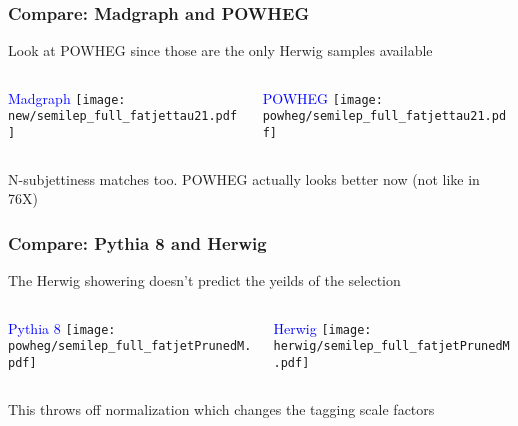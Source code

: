 \documentclass{beamer}
\begin{document}
\begin{frame}
  \frametitle{Compare: Madgraph and POWHEG}
  Look at POWHEG since those are the only Herwig samples available
  \vspace{6pt}
  \begin{columns}
    \begin{column}{0.5\linewidth}
      \centering
      \textcolor{blue}{Madgraph}
      \texttt{[image: new/semilep\_full\_fatjettau21.pdf]}
    \end{column}
    \begin{column}{0.5\linewidth}
      \centering
      \textcolor{blue}{POWHEG}
      \texttt{[image: powheg/semilep\_full\_fatjettau21.pdf]}
    \end{column}
  \end{columns}
  N-subjettiness matches too. POWHEG actually looks better now (not like in 76X)
\end{frame}

\begin{frame}
  \frametitle{Compare: Pythia 8 and Herwig}
  The Herwig showering doesn't predict the yeilds of the selection
  \vspace{6pt}
  \begin{columns}
    \begin{column}{0.5\linewidth}
      \centering
      \textcolor{blue}{Pythia 8}
      \texttt{[image: powheg/semilep\_full\_fatjetPrunedM.pdf]}
    \end{column}
    \begin{column}{0.5\linewidth}
      \centering
      \textcolor{blue}{Herwig}
      \texttt{[image: herwig/semilep\_full\_fatjetPrunedM.pdf]}
    \end{column}
  \end{columns}
  This throws off normalization which changes the tagging scale factors
\end{frame}
\end{document}
